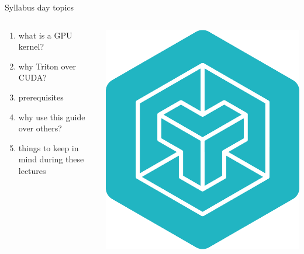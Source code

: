 \documentclass[aspectratio=169]{beamer}
\begin{document}
\begin{frame}{Syllabus day topics}
\begin{columns}[T]
    \begin{column}[T]{0.5\textwidth}
        \begin{enumerate}
            \item what is a GPU kernel?
            \item why Triton over CUDA?
            \item prerequisites
            \item why use this guide over others?
            \item things to keep in mind during these lectures
            \end{enumerate}
    \end{column}
    \begin{column}{0.5\textwidth}
        \includegraphics[height=0.8\textheight]{pics/triton-logo.png}
    \end{column}
\end{columns}
\end{frame}
\end{document}
